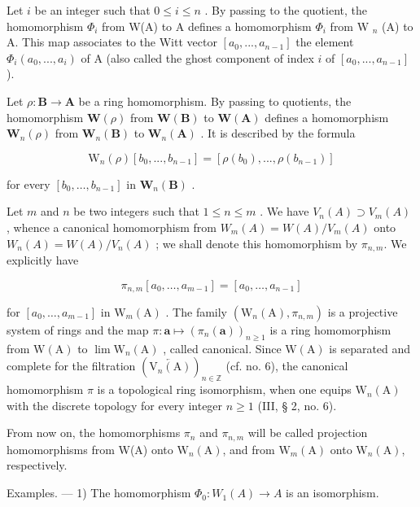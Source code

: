 Let \(i\) be an integer such that \(0 \leqslant i \leqslant n\) . By passing to the quotient, the homomorphism \(\Phi_{i}\) from W(A) to A defines a homomorphism \(\Phi_{i}\) from W \(_{n}\) (A) to A. This map associates to the Witt vector \([a_{0}, ..., a_{n-1}]\) the element \(\Phi_{i}(a_{0}, ..., a_{i})\) of A (also called the ghost component of index \(i\) of \([a_{0}, ..., a_{n-1}]\) ).

Let \(\rho : \mathbf{B} \to \mathbf{A}\) be a ring homomorphism. By passing to quotients, the homomorphism \(\mathbf{W}(\rho)\) from \(\mathbf{W}(\mathbf{B})\) to \(\mathbf{W}(\mathbf{A})\) defines a homomorphism \(\mathbf{W}_n(\rho)\) from \(\mathbf{W}_n(\mathbf{B})\) to \(\mathbf{W}_n(\mathbf{A})\) . It is described by the formula

\[
\mathrm{W} _ {n} (\rho) \left[ b _ {0},..., b _ {n - 1} \right] = \left[ \rho (b _ {0}),..., \rho (b _ {n - 1}) \right]\tag{43}
\]

for every \([b_0, \ldots, b_{n-1}]\) in \(\mathbf{W}_n(\mathbf{B})\) .

Let \(m\) and \(n\) be two integers such that \(1 \leqslant n \leqslant m\) . We have \(V_n(A) \supset V_m(A)\) , whence a canonical homomorphism from \(W_m(A) = W(A)/V_m(A)\) onto \(W_n(A) = W(A)/V_n(A)\) ; we shall denote this homomorphism by \(\pi_{n,m}\). We explicitly have

\[
\pi_ {n, m} [ a _ {0}, \dots , a _ {m - 1} ] = [ a _ {0}, \dots , a _ {n - 1} ]\tag{44}
\]

for \([a_0, \ldots, a_{m-1}]\) in \(\mathrm{W}_m(\mathrm{A})\) . The family \((\mathrm{W}_n(\mathrm{A}), \pi_{n,m})\) is a projective system of rings and the map \(\pi: \boldsymbol{a} \mapsto (\pi_n(\boldsymbol{a}))_{n \geqslant 1}\) is a ring homomorphism from \(\mathrm{W}(\mathrm{A})\) to \(\lim \mathrm{W}_n(\mathrm{A})\) , called canonical. Since \(\mathrm{W}(\mathrm{A})\) is separated and complete for the filtration \((\overleftarrow{\mathrm{V}_n(\mathrm{A})})_{n \in \mathbb{Z}}\) (cf. no. 6), the canonical homomorphism \(\pi\) is a topological ring isomorphism, when one equips \(\mathrm{W}_n(\mathrm{A})\) with the discrete topology for every integer \(n \geqslant 1\) (III, § 2, no. 6).

From now on, the homomorphisms \(\pi_{n}\) and \(\pi_{n,m}\) will be called projection homomorphisms from W(A) onto \(\mathrm{W}_{n}(\mathrm{A})\), and from \(\mathrm{W}_{m}(\mathrm{A})\) onto \(\mathrm{W}_{n}(\mathrm{A})\), respectively.

Examples. --- 1) The homomorphism \(\Phi_{0}:W_{1}(A)\to A\) is an isomorphism.

